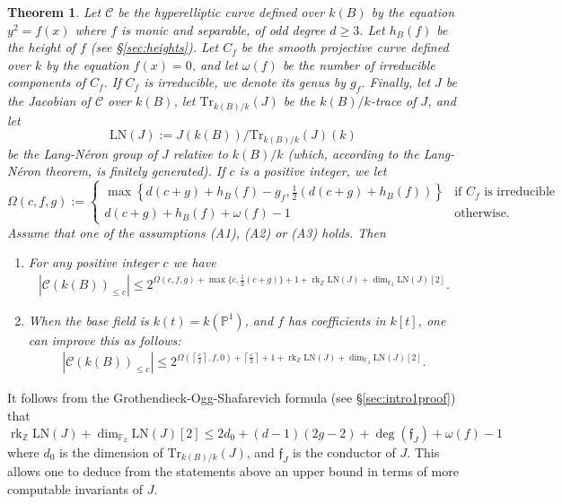 \documentclass[11pt]{article}
\newcommand{\Z}{\ensuremath{\mathbb{Z}}}
\newcommand{\F}{\ensuremath{\mathbb{F}}}
\theoremstyle{plain}
\newtheorem{theorem}{Theorem}[section]
\theoremstyle{definition}
\DeclareMathOperator{\rk}{rk}
\newcommand{\LN}{\mathrm{LN}}
\newcommand{\Tr}{\mathrm{Tr}}
\begin{document}
\begin{theorem}
\label{thm:intro1}
Let $\mathcal{C}$ be the hyperelliptic curve defined over $k(B)$ by the equation $y^2=f(x)$ where $f$ is monic and separable, of odd degree $d\geq 3$. Let $h_B(f)$ be the height of $f$ (see \S{}\ref{sec:heights}). Let $C_f$ be the smooth projective curve defined over $k$ by the equation $f(x)=0$, and let $\omega(f)$ be the number of irreducible components of $C_f$. If $C_f$ is irreducible, we denote its genus by $g_f$. Finally, let $J$ be the Jacobian of $\mathcal{C}$ over $k(B)$, let $\Tr_{k(B)/k}(J)$ be the $k(B)/k$-trace of $J$, and let
$$
\LN(J) := J(k(B))/\Tr_{k(B)/k}(J)(k)
$$
be the Lang-N{\'e}ron group of $J$ relative to $k(B)/k$ (which, according to the Lang-N{\'e}ron theorem, is finitely generated).
If $c$ is a positive integer, we let
$$
\Omega(c,f,g) :=
\begin{cases}
 \max\left\{d(c+g)+h_B(f)-g_f, \frac{1}{2}(d(c+g)+h_B(f))\right\} & \text{if $C_f$ is irreducible} \\
 d(c+g)+h_B(f) + \omega(f) -1 & \text{otherwise.}
\end{cases}
$$
Assume that one of the assumptions (A1), (A2) or (A3) holds. Then
\begin{enumerate}
\item[(1)] For any positive integer $c$ we have
\begin{align*}
|\mathcal{C}(k(B))_{\leq c}| \leq 2^{\Omega(c,f,g) + \max\{c, \frac{1}{2}(c+g)\} +1 + \rk_\Z \LN(J) + \dim_{\F_2} \LN(J)[2]}.
\end{align*}
\item[(2)] When the base field is $k(t)=k(\mathbb{P}^1)$, and $f$ has coefficients in $k[t]$, one can improve this as follows:
\begin{align*}
|\mathcal{C}(k(B))_{\leq c}| \leq 2^{\Omega\left(\left\lceil\frac{c}{2}\right\rceil,f,0\right)
+ \left\lceil\frac{c}{2}\right\rceil +1 + \rk_\Z \LN(J) + \dim_{\F_2} \LN(J)[2]}.
\end{align*}
\end{enumerate}
\end{theorem}

It follows from the Grothendieck-Ogg-Shafarevich formula (see \S{}\ref{sec:intro1proof}) that
\begin{equation}
\label{eq:GOSpimp}
\rk_\Z \LN(J) + \dim_{\F_2} \LN(J)[2] \leq 2d_0 +(d-1)(2g-2)+ \deg(\mathfrak{f}_J)+\omega(f) -1
\end{equation}
where $d_0$ is the dimension of $\Tr_{k(B)/k}(J)$, and $\mathfrak{f}_J$ is the conductor of $J$. This allows one to deduce from the statements above an upper bound in terms of more computable invariants of $J$.
\end{document}
